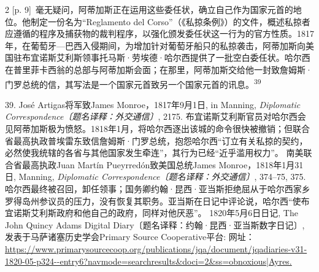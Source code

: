 \documentclass[10pt,a4paper]{article}
\begin{document}
\begin{paracol}{2}
{\scriptsize\color{gray} [p. 9]}\ 毫无疑问，阿蒂加斯正在运用这些委任状，确立自己作为国家元首的地位。他制定一份名为“Reglamento del Corso”（《私掠条例》）的文件，概述私掠者应遵循的程序及捕获物的裁判程序，以强化颁发委任状这一行为的官方性质。1817年，在葡萄牙—巴西入侵期间，为增加针对葡萄牙船只的私掠袭击，阿蒂加斯向美国驻布宜诺斯艾利斯领事托马斯·劳埃德·哈尔西提供了一批空白委任状。哈尔西在普里菲卡西翁的总部与阿蒂加斯会面；在那里，阿蒂加斯交给他一封致詹姆斯·门罗总统的信，其写法是一个国家元首致另一个国家元首的讯\mbox{息。\textsuperscript{39}}\par{\small 39. José Artigas将军致James Monroe，1817年9月1日, in Manning, \textit{Diplomatic Correspondence〔题名译释：外交通信〕}, 2175. 布宜诺斯艾利斯官员对哈尔西会见阿蒂加斯极为愤怒。1818年1月，将哈尔西逐出该城的命令很快被撤销；但联合省最高执政普埃雷东致信詹姆斯·门罗总统，抱怨哈尔西“订立有关私掠的契约，必然使我统辖的各省与其他国家发生牵连”，其行为已经“近乎滥用权力”。 南美联合省最高执政Juan Martín Pueyrredón致美国总统James Monroe，1818年1月31日, Manning, \textit{Diplomatic Correspondence〔题名译释：外交通信〕}, 374–75, 375. 哈尔西最终被召回，卸任领事；国务卿约翰·昆西·亚当斯拒绝屈从于哈尔西家乡罗得岛州参议员的压力，没有恢复其职务。亚当斯在日记中评论说，哈尔西“使布宜诺斯艾利斯政府和他自己的政府，同样对他厌恶”。 1820年5月6日日记, The John Quincy Adams Digital Diary〔题名译释：约翰·昆西·亚当斯数字日记〕, 发表于马萨诸塞历史学会Primary Source Cooperative平台: 网址： \url{https://www.primarysourcecoop.org/publications/jqa/document/jqadiaries-v31-1820-05-p324--entry6?navmode=searchresults&doci=2&ss=obnoxious|Ayres.}\par}
\switchcolumn

\end{paracol}
\end{document}
